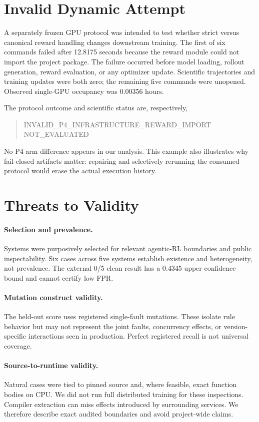 \documentclass[10pt]{article}
\begin{document}
\section{Invalid Dynamic Attempt}

A separately frozen GPU protocol was intended to test whether strict versus
canonical reward handling changes downstream training.  The first of six
commands failed after 12.8175 seconds because the reward module could not
import the project package.  The failure occurred before model loading,
rollout generation, reward evaluation, or any optimizer update.  Scientific
trajectories and training updates were both zero; the remaining five commands
were unopened.  Observed single-GPU occupancy was 0.00356 hours.

The protocol outcome and scientific status are, respectively,
\begin{quote}
\small\ttfamily
INVALID\_P4\_INFRASTRUCTURE\_REWARD\_IMPORT\\
NOT\_EVALUATED
\end{quote}
No P4 arm difference appears in our analysis.  This example also illustrates
why fail-closed artifacts matter: repairing and selectively rerunning the
consumed protocol would erase the actual execution history.

\section{Threats to Validity}

\paragraph{Selection and prevalence.}
Systems were purposively selected for relevant agentic-RL boundaries and
public inspectability.  Six cases across five systems establish existence and
heterogeneity, not prevalence.  The external 0/5 clean result has a 0.4345
upper confidence bound and cannot certify low FPR.

\paragraph{Mutation construct validity.}
The held-out score uses registered single-fault mutations.  These isolate rule
behavior but may not represent the joint faults, concurrency effects, or
version-specific interactions seen in production.  Perfect registered recall
is not universal coverage.

\paragraph{Source-to-runtime validity.}
Natural cases were tied to pinned source and, where feasible, exact function
bodies on CPU.  We did not run full distributed training for these inspections.
Compiler extraction can miss effects introduced by surrounding services.  We
therefore describe exact audited boundaries and avoid project-wide claims.
\end{document}
